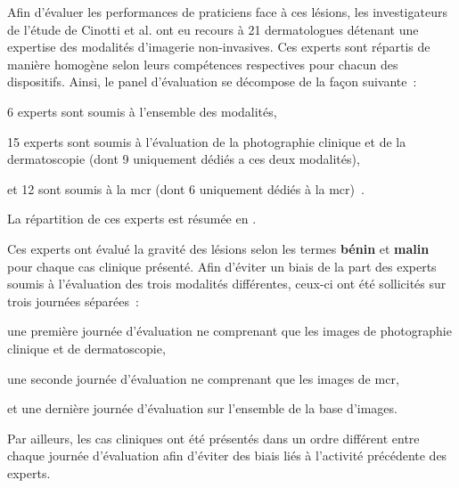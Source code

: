 \addtocounter{footnote}{1}
\addtocounter{footnote}{1}
\addtocounter{footnote}{1}

Afin d'évaluer les performances de praticiens face à ces lésions, les investigateurs de l'étude de Cinotti et al. ont eu recours à 21 dermatologues détenant une expertise des modalités d'imagerie non-invasives. Ces experts sont répartis de manière homogène selon leurs compétences respectives pour chacun des dispositifs. Ainsi, le panel d'évaluation se décompose de la façon suivante~:~
\begin{inlinerate}
    \item 6 experts sont soumis à l'ensemble des modalités,
    \item 15 experts sont soumis à l'évaluation de la photographie clinique et de la dermatoscopie (dont 9 uniquement dédiés a ces deux modalités),
    \item et 12 sont soumis à la \gls{mcr} (dont 6 uniquement dédiés à la \gls{mcr})~\cite{Cinotti2018}.
\end{inlinerate}
La répartition de ces experts est résumée en .\par

Ces experts ont évalué la gravité des lésions selon les termes \textbf{bénin} et \textbf{malin} pour chaque cas clinique présenté. Afin d'éviter un biais de la part des experts soumis à l'évaluation des trois modalités différentes, ceux-ci ont été sollicités sur trois journées séparées~:
\begin{inlinerate}
    \item une première journée d'évaluation ne comprenant que les images de photographie clinique et de dermatoscopie,
    \item une seconde journée d'évaluation ne comprenant que les images de \gls{mcr},
    \item et une dernière journée d'évaluation sur l'ensemble de la base d'images.
\end{inlinerate}
Par ailleurs, les cas cliniques ont été présentés dans un ordre différent entre chaque journée d'évaluation afin d'éviter des biais liés à l'activité précédente des experts.\par

